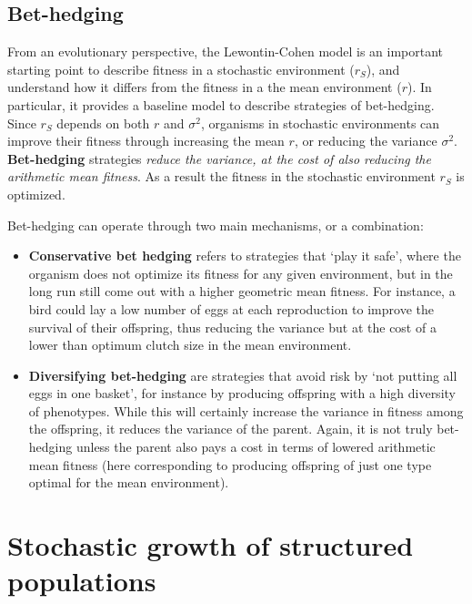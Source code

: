 \documentclass[
]{book}
\begin{document}
\hypertarget{bet-hedging}{%
\subsection{Bet-hedging}\label{bet-hedging}}

From an evolutionary perspective, the Lewontin-Cohen model is an important starting point to describe fitness in a stochastic environment (\(r_S\)), and understand how it differs from the fitness in a the mean environment (\(r\)). In particular, it provides a baseline model to describe strategies of bet-hedging. Since \(r_S\) depends on both \(r\) and \(\sigma^2\), organisms in stochastic environments can improve their fitness through increasing the mean \(r\), or reducing the variance \(\sigma^2\). \textbf{Bet-hedging} strategies \emph{reduce the variance, at the cost of also reducing the arithmetic mean fitness}. As a result the fitness in the stochastic environment \(r_S\) is optimized.

Bet-hedging can operate through two main mechanisms, or a combination:

\begin{itemize}
\item
  \textbf{Conservative bet hedging} refers to strategies that `play it safe', where the organism does not optimize its fitness for any given environment, but in the long run still come out with a higher geometric mean fitness. For instance, a bird could lay a low number of eggs at each reproduction to improve the survival of their offspring, thus reducing the variance but at the cost of a lower than optimum clutch size in the mean environment.
\item
  \textbf{Diversifying bet-hedging} are strategies that avoid risk by `not putting all eggs in one basket', for instance by producing offspring with a high diversity of phenotypes. While this will certainly increase the variance in fitness among the offspring, it reduces the variance of the parent. Again, it is not truly bet-hedging unless the parent also pays a cost in terms of lowered arithmetic mean fitness (here corresponding to producing offspring of just one type optimal for the mean environment).
\end{itemize}

\hypertarget{stochastic-growth-of-structured-populations}{%
\section{Stochastic growth of structured populations}\label{stochastic-growth-of-structured-populations}}
\end{document}
